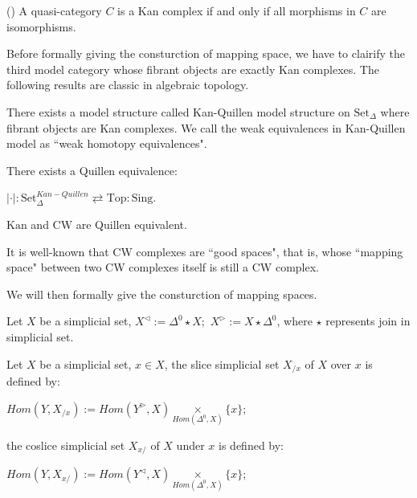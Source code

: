 \begin{theorem}(\textcite{Joyal})
    A quasi-category $C$ is a Kan complex if and only if all morphisms in $C$ are isomorphisms.
\end{theorem}

Before formally giving the consturction of mapping space, we have to clairify the third model category whose fibrant objects are exactly Kan complexes. The following results are classic in algebraic topology.

\begin{theorem}
    There exists a model structure called Kan-Quillen model structure on $\text{Set}_\Delta$ where fibrant objects are Kan complexes. We call the weak equivalences in Kan-Quillen model as ``weak homotopy equivalences".
\end{theorem}

\begin{theorem}
    There exists a Quillen equivalence:

    $|\cdot|:\text{Set}_\Delta^{Kan-Quillen} \rightleftarrows \text{Top}:\text{Sing}$.
\end{theorem}

\begin{corollary}
    $\text{Kan}$ and $\text{CW}$ are Quillen equivalent.
\end{corollary}

It is well-known that CW complexes are ``good spaces", that is, whose ``mapping space" between two CW complexes itself is still a CW complex.



We will then formally give the consturction of mapping spaces.

\begin{definition}
    Let $X$ be a simplicial set, $X^{\lhd}:= \Delta^0 \star X;$ $ X^{\rhd}:= X \star \Delta^0$, where $\star$ represents join in simplicial set.
\end{definition}

\begin{definition}
    Let $X$ be a simplicial set, $x\in X$, the slice simplicial set $X_{/x}$ of $X$ over $x$ is defined by:

    $Hom(Y,X_{/x}):= Hom(Y^{\rhd},X)\underset{Hom(\Delta^0,X)}{\times}\{x\}$;

    the coslice simplicial set $X_{x/}$ of $X$ under $x$ is defined by:
    
    $Hom(Y,X_{x/}):= Hom(Y^{\lhd},X)\underset{Hom(\Delta^0,X)}{\times}\{x\}$;
\end{definition}

